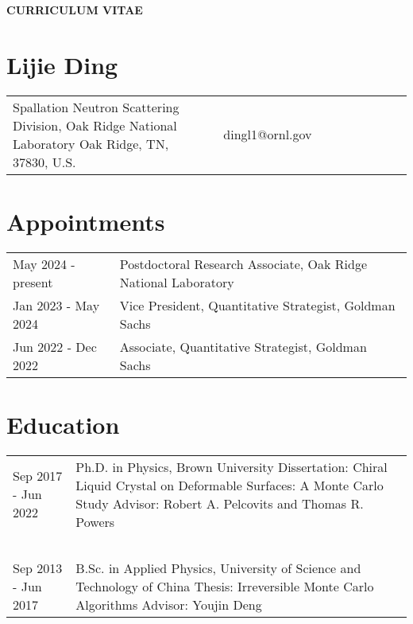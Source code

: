 \documentclass[11pt,letterpaper]{article}
\begin{document}
\pagestyle{headings}
\begin{center}
    \Large{\textbf{CURRICULUM VITAE}}
\end{center}
\section*{Lijie Ding}
\vspace*{-0.15in}
\begin{longtable}{p{0.5\linewidth} p{0.5\linewidth}}
    Spallation Neutron Scattering Division, \newline
    Oak Ridge National Laboratory \newline
    Oak Ridge, TN, 37830, U.S.
     & ~\newline
    dingl1@ornl.gov
\end{longtable}


\section*{Appointments}
\vspace*{-0.15in}
\begin{longtable}{l p{\linewidth}}
    May 2024 - present & Postdoctoral Research Associate, Oak Ridge National Laboratory \\
    Jan 2023 - May 2024 & Vice President, Quantitative Strategist, Goldman Sachs \\
    Jun 2022 - Dec 2022 & Associate, Quantitative Strategist, Goldman Sachs \\
\end{longtable}


\section*{Education}
\vspace*{-0.15in}
\begin{longtable}{l p{\linewidth}}
    Sep 2017 - Jun 2022   & Ph.D. in Physics, Brown University \newline
    Dissertation: Chiral Liquid Crystal on Deformable Surfaces: A Monte Carlo Study \newline
    Advisor: Robert A. Pelcovits and Thomas R. Powers                                                 \\~\\
    Sep 2013 - Jun 2017   & B.Sc. in Applied Physics, University of Science and Technology of China \newline
    Thesis: Irreversible Monte Carlo Algorithms \newline
    Advisor: Youjin Deng
\end{longtable}
\end{document}
